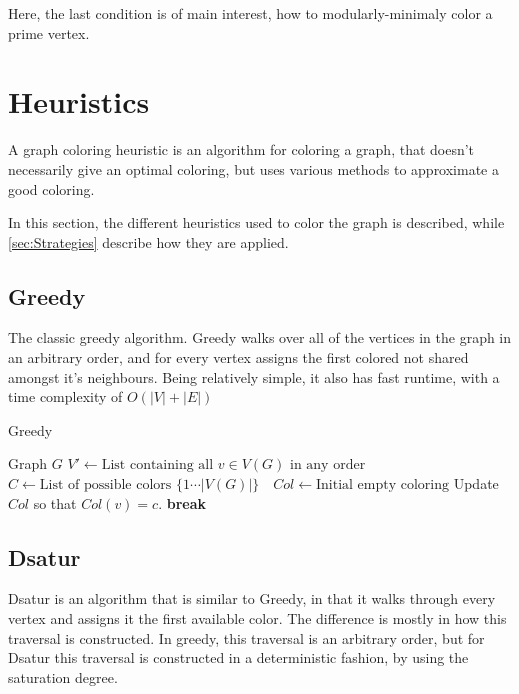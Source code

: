 \documentclass{amsart}
\newcommand{\algorithmicbreak}{\textbf{break}}
\newcommand{\BREAK}{\STATE \algorithmicbreak}
\begin{document}
Here, the last condition is of main interest, how to modularly-minimaly 
color a prime vertex.

\section{Heuristics}
\label{sec:Heuristics}

A graph coloring heuristic is an algorithm for coloring a graph, that doesn't
necessarily give an optimal coloring, but uses various methods to approximate a
good coloring.


In this section, the different heuristics used to color the graph is described,
while \autoref{sec:Strategies} describe how they are applied.
\subsection{Greedy}
The classic greedy algorithm. Greedy walks over all of the vertices in the graph
in an arbitrary order, and for every vertex assigns the first colored not shared
amongst it's neighbours. Being relatively simple, it also has fast runtime, with
a time complexity of $O(|V|+|E|)$ \cite{Constructive}

\begin{algorithm}[H]
  \caption{Greedy}
  \label{alg:greedy}
  \begin{algorithmic}[1]
    \REQUIRE Graph $G$
      \STATE $V' \leftarrow \text{List containing all $v \in V(G)$ in any order}$
      \STATE $C \leftarrow \text{List of possible colors $\{1 \cdots |V(G)| \}$ }$
      \STATE $Col \leftarrow \text{Initial empty coloring}$
                \STATE Update $Col$ so that $Col(v) = c$.
                \BREAK
            \ENDIF
        \ENDFOR
    \ENDFOR
  \end{algorithmic}
\end{algorithm}
\subsection{Dsatur}

Dsatur is an algorithm that is similar to Greedy, in that it walks through every
vertex and assigns it the first available color. The difference is mostly in
how this traversal is constructed. In greedy, this traversal is an arbitrary
order, but for Dsatur this traversal is constructed in a deterministic fashion,
by using the saturation degree.
\end{document}
